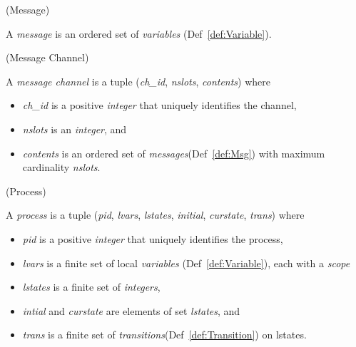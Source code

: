 \begin{definition}{}{}
\label{def:Msg}
(Message)

A \textit{message} is an ordered set of \textit{variables} (Def~\ref{def:Variable}).
\end{definition}

\begin{definition}{}{}
\label{def:MsgChan}
(Message Channel)

A \textit{message channel} is a tuple (\textit{ch\_id}, \textit{nslots}, \textit{contents}) where
\begin{itemize}
\item[] \textit{ch\_id} is a positive \textit{integer} that uniquely identifies the channel,
\item[] \textit{nslots} is an \textit{integer}, and
\item[] \textit{contents} is an ordered set of \textit{messages}(Def~\ref{def:Msg}) with maximum cardinality \textit{nslots}.
\end{itemize}
\end{definition}

\begin{definition}{}{}
\label{def:Process}
(Process)

A \textit{process} is a tuple (\textit{pid}, \textit{lvars}, \textit{lstates}, \textit{initial}, \textit{curstate}, \textit{trans}) where
\begin{itemize}
\item[] \textit{pid} is a positive \textit{integer} that uniquely identifies the process,
\item[] \textit{lvars} is a finite set of local \textit{variables} (Def~\ref{def:Variable}), each with a \textit{scope}
\item[] \textit{lstates} is a finite set of \textit{integers},
\item[] \textit{intial} and \textit{curstate} are elements of set \textit{lstates}, and
\item[] \textit{trans} is a finite set of \textit{transitions}(Def~\ref{def:Transition}) on lstates.
\end{itemize}
\end{definition}

